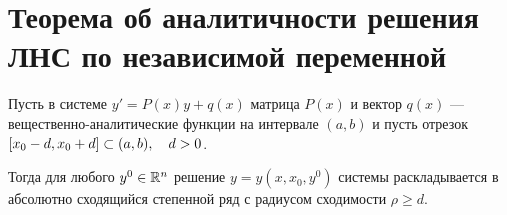\section{Теорема об аналитичности решения ЛНС по независимой переменной}

\begin{theorem}
    Пусть в системе $ y' = P(x)y + q(x) $ матрица $ P(x) $ и вектор $ q(x) $ --- вещественно-аналитические функции на интервале $ (a, b) $ и пусть отрезок $ [x_0 - d, x_0 + d] \subset (a, b), \quad d > 0 $.

    Тогда для любого $ y^0 \in \mathbb{R}^n $ решение $ y = y(x, x_0, y^0) $ системы раскладывается в абсолютно сходящийся степенной ряд  с радиусом сходимости $ \rho \ge d $.
\end{theorem}
